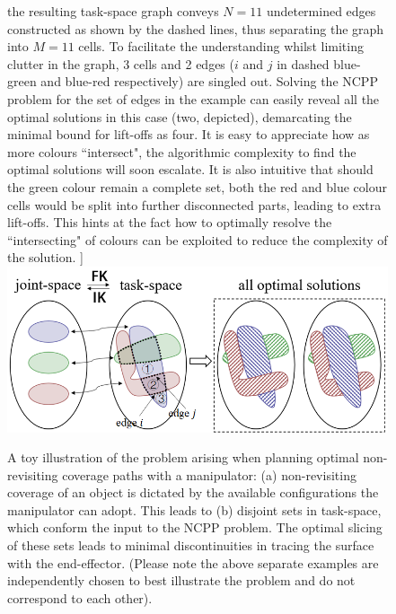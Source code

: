 \documentclass[journal]{IEEEtran}
\begin{document}
\begin{figure}[t]
the resulting task-space graph conveys $N = 11$ undetermined edges constructed as shown by the dashed lines, thus separating the graph into $M = 11$ cells.
To facilitate the understanding whilst limiting clutter in the graph, 3 cells and 2 edges ($i$ and $j$ in dashed blue-green and blue-red respectively) are singled out. 
Solving the NCPP problem for the set of edges in the example can easily reveal all the optimal solutions in this case (two, depicted), demarcating the minimal bound for lift-offs as four. 
It is easy to appreciate how as more colours ``intersect", the algorithmic complexity to find the optimal solutions will soon escalate. %
It is also intuitive that should the green colour remain a complete set, both the red and blue colour cells would be split into further disconnected parts, 
leading to extra lift-offs. 
This hints at the fact how to optimally resolve the ``intersecting" of colours can be exploited to reduce the complexity of the solution.
]{
	\includegraphics[width = 0.97\columnwidth]{figures/mapping_2}
	\label{fig:toy_coverage_graph_example}
}
\caption{A toy illustration of the problem arising when planning optimal non-revisiting coverage paths with a manipulator: (a) non-revisiting coverage of an object is dictated by the 
available configurations the manipulator can adopt. This leads to (b) disjoint sets in task-space, which conform the input to the NCPP problem. The optimal slicing of these sets leads to minimal discontinuities in tracing the surface with the end-effector. (Please note the above separate examples are independently chosen to best illustrate the problem and do not correspond to each other).
}
\label{fig:mapping}
\end{figure}
\end{document}

